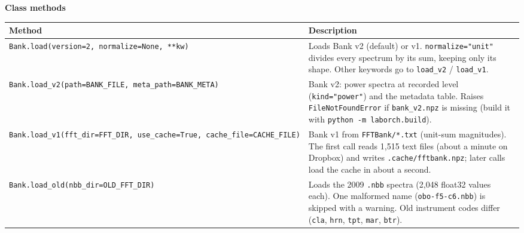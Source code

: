 \documentclass[
  10pt,
]{article}
\begin{document}
\textbf{Class methods}

\begin{longtable}[]{@{}ll@{}}
\toprule
\begin{minipage}[b]{0.47\columnwidth}\raggedright
Method\strut
\end{minipage} &
\begin{minipage}[b]{0.47\columnwidth}\raggedright
Description\strut
\end{minipage}\tabularnewline
\midrule
\endhead
\begin{minipage}[t]{0.47\columnwidth}\raggedright
\texttt{Bank.load(version=2,\ normalize=None,\ **kw)}\strut
\end{minipage} &
\begin{minipage}[t]{0.47\columnwidth}\raggedright
Loads Bank v2 (default) or v1. \texttt{normalize="unit"}
divides every spectrum by its sum, keeping only its shape.
Other keywords go to \texttt{load\_v2} /
\texttt{load\_v1}.\strut
\end{minipage}\tabularnewline
\begin{minipage}[t]{0.47\columnwidth}\raggedright
\texttt{Bank.load\_v2(path=BANK\_FILE,\ meta\_path=BANK\_META)}\strut
\end{minipage} &
\begin{minipage}[t]{0.47\columnwidth}\raggedright
Bank v2: power spectra at recorded level
(\texttt{kind="power"}) and the metadata table. Raises
\texttt{FileNotFoundError} if \texttt{bank\_v2.npz} is
missing (build it with
\texttt{python\ -m\ laborch.build}).\strut
\end{minipage}\tabularnewline
\begin{minipage}[t]{0.47\columnwidth}\raggedright
\texttt{Bank.load\_v1(fft\_dir=FFT\_DIR,\ use\_cache=True,\ cache\_file=CACHE\_FILE)}\strut
\end{minipage} &
\begin{minipage}[t]{0.47\columnwidth}\raggedright
Bank v1 from \texttt{FFTBank/*.txt} (unit-sum magnitudes).
The first call reads 1,515 text files (about a minute on
Dropbox) and writes \texttt{.cache/fftbank.npz}; later calls
load the cache in about a second.\strut
\end{minipage}\tabularnewline
\begin{minipage}[t]{0.47\columnwidth}\raggedright
\texttt{Bank.load\_old(nbb\_dir=OLD\_FFT\_DIR)}\strut
\end{minipage} &
\begin{minipage}[t]{0.47\columnwidth}\raggedright
Loads the 2009 \texttt{.nbb} spectra (2,048 float32 values
each). One malformed name (\texttt{obo-f5-c6.nbb}) is
skipped with a warning. Old instrument codes differ
(\texttt{cla}, \texttt{hrn}, \texttt{tpt}, \texttt{mar},
\texttt{btr}).\strut
\end{minipage}\tabularnewline
\bottomrule
\end{longtable}
\end{document}
